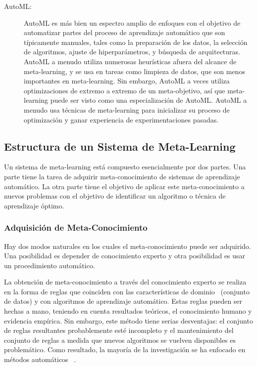 \begin{description}
	\item[AutoML:] AutoML es más bien un espectro amplio de enfoques con el
    objetivo de automatizar partes del proceso de aprendizaje automático que
    son típicamente manuales, tales como la preparación de los datos, la
    selección de algoritmos, ajuste de hiperparámetros, y búsqueda de
    arquitecturas. AutoML a menudo utiliza numerosas heurísticas afuera del
    alcance de meta-learning, y se usa en tareas como limpieza de datos, que
    son menos importantes en meta-learning. Sin embargo, AutoML a veces
    utiliza optimizaciones de extremo a extremo de un meta-objetivo, así que
    meta-learning puede ser visto como una especialización de AutoML. AutoML
    a menudo usa técnicas de meta-learning para inicializar su proceso de
    optimización y ganar experiencia de experimentaciones pasadas.
\end{description}

\subsection{Estructura de un Sistema de Meta-Learning}

Un sistema de meta-learning está compuesto esencialmente por dos partes. Una
parte tiene la tarea de adquirir meta-conocimiento de sistemas de aprendizaje
automático. La otra parte tiene el objetivo de aplicar este meta-conocimiento
a nuevos problemas con el objetivo de identificar un algoritmo o técnica de
aprendizaje óptimo.

\subsubsection{Adquisición de Meta-Conocimiento} 

Hay dos modos naturales en los cuales el meta-conocimiento puede ser adquirido.
Una posibilidad es depender de conocimiento experto y otra posibilidad es usar
un procedimiento automático. 

La obtención de meta-conocimiento a través del conocimiento experto se realiza
en la forma de reglas que coinciden con las características de dominio~
(conjunto de datos) y con algoritmos de aprendizaje automático. Estas reglas
pueden ser hechas a mano, teniendo en cuenta resultados teóricos, el
conocimiento humano y evidencia empírica. Sin embargo, este método tiene serias
desventajas: el conjunto de reglas resultantes probablemente esté incompleto y
el mantenimiento del conjunto de reglas a medida que nuevos algoritmos se
vuelven disponibles es problemático. Como resultado, la mayoría de la
investigación se ha enfocado en métodos automáticos
~.
	
